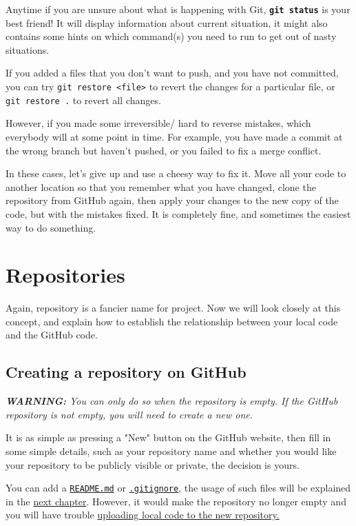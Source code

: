 Anytime if you are unsure about what is happening with Git, \textbf{\texttt{git status}} is your best friend! It will display information about current situation, it might also contains some hints on which command(s) you need to run to get out of nasty situations.
\vspace{6mm}

If you added a files that you don't want to push, and you have not committed, you can try \texttt{git restore <file>} to revert the changes for a particular file, or \texttt{git restore .} to revert all changes.

However, if you made some irreversible/ hard to reverse mistakes, which everybody will at some point in time. For example, you have made a commit at the wrong branch but haven't pushed, or you failed to fix a merge conflict. 

In these cases, let's give up and use a cheesy way to fix it. Move all your code to another location so that you remember what you have changed, clone the repository from GitHub again, then apply your changes to the new copy of the code, but with the mistakes fixed. It is completely fine, and sometimes the easiest way to do something.

\section{Repositories}

Again, repository is a fancier name for project. Now we will look closely at this concept, and explain how to establish the relationship between your local code and the GitHub code.

\subsection{Creating a repository on GitHub}
\label{sec:gituploadgithub}

\textit{\textbf{WARNING: } You can only do so when the repository is empty. If the GitHub repository is not empty, you will need to create a new one.}

It is as simple as pressing a "New" button on the GitHub website, then fill in some simple details, such as your repository name and whether you would like your repository to be publicly visible or private, the decision is yours.

You can add a \hyperref[sec:readme]{\texttt{README.md}} or \hyperref[sec:gitignore]{\texttt{.gitignore}}, the usage of such files will be explained in the \hyperref[sec:projstructure]{next chapter}. However, it would make the repository no longer empty and you will have trouble \hyperref[sec:gituploadgithub]{uploading local code to the new repository.}

